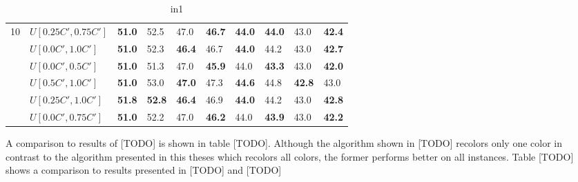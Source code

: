 \begin{table}[h]
{\begin{tabular}{|l|l||l|l||l|l||l|l||l|l|}
      \hline\hline
      \multirow{6}{*}{10}
       & $U[0.25C',0.75C']$ & \textbf{51.0} & 52.5 		& 47.0 & \textbf{46.7} 		& \textbf{44.0} & \textbf{44.0} 		& 43.0 & \textbf{42.4}\\
       & $U[0.0C',1.0C']$ & \textbf{51.0} & 52.3 			& \textbf{46.4} & 46.7 		& \textbf{44.0} & 44.2 		& 43.0 & \textbf{42.7}\\
       & $U[0.0C',0.5C']$ & \textbf{51.0} & 51.3 			& 47.0 & \textbf{45.9} 		& 44.0 & \textbf{43.3} 		& 43.0 & \textbf{42.0}\\
       & $U[0.5C',1.0C']$ & \textbf{51.0} & 53.0 			& \textbf{47.0} & 47.3 		& \textbf{44.6} & 44.8 		& \textbf{42.8} & 43.0\\
       & $U[0.25C',1.0C']$ & \textbf{51.8} & \textbf{52.8} & \textbf{46.4} & 46.9 	& \textbf{44.0} & 44.2 		& 43.0 & \textbf{42.8}\\
       & $U[0.0C',0.75C']$ & \textbf{51.0} & 52.2 			& 47.0 & \textbf{46.2} 		& 44.0 & \textbf{43.9} 		& 43.0 & \textbf{42.2}\\
      \hline
      \end{tabular}
      }
      \caption{in1}
      \label{tab:in1comp}\end{table}



A comparison to results of [TODO] is shown in table [TODO]. Although the algorithm shown in [TODO] recolors only one color in contrast to the algorithm presented in this theses which recolors all colors, the former performs better on all instances. Table [TODO] shows a comparison to results presented in [TODO] and [TODO]
